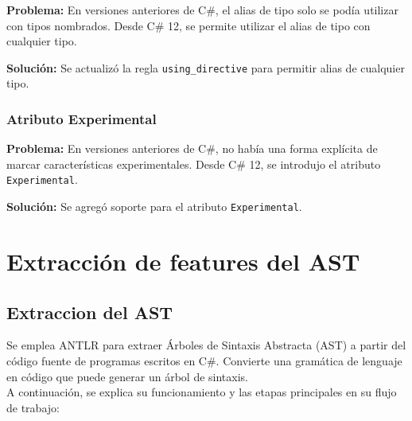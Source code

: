 \textbf{Problema:} En versiones anteriores de C\#, el alias de tipo solo se pod\'ia utilizar con tipos nombrados. Desde C\# 12, se permite utilizar el alias de tipo con cualquier tipo.

\textbf{Soluci\'on:} Se actualiz\'o la regla \texttt{using\_directive} para permitir alias de cualquier tipo.

\subsection{Atributo Experimental}

\textbf{Problema:} En versiones anteriores de C\#, no hab\'ia una forma expl\'icita de marcar caracter\'isticas experimentales. Desde C\# 12, se introdujo el atributo \texttt{Experimental}.

\textbf{Soluci\'on:} Se agreg\'o soporte para el atributo \texttt{Experimental}.


\chapter{Extracción de features del AST}\label{chapter:proposal}

\section{Extraccion del AST}

 Se emplea ANTLR para extraer Árboles de Sintaxis Abstracta (AST) a partir del código fuente de programas escritos en C\#. Convierte una gramática de lenguaje en código que puede generar un árbol de sintaxis. \\
 A continuación, se explica su funcionamiento y las etapas principales en su flujo de trabajo:
 

